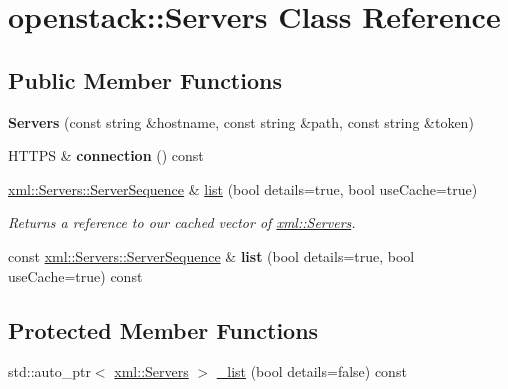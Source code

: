 \hypertarget{classopenstack_1_1Servers}{
\section{openstack::Servers Class Reference}
\label{classopenstack_1_1Servers}
}
\subsection*{Public Member Functions}
\begin{DoxyCompactItemize}
\item 
\hypertarget{classopenstack_1_1Servers_aa73baeb7fe19a9fcbb33b9b1c321c0b3}{
{\bfseries Servers} (const string \&hostname, const string \&path, const string \&token)}
\label{classopenstack_1_1Servers_aa73baeb7fe19a9fcbb33b9b1c321c0b3}

\item 
\hypertarget{classopenstack_1_1Servers_ac46388d4916edea6bbe24c6c1189397a}{
HTTPS \& {\bfseries connection} () const }
\label{classopenstack_1_1Servers_ac46388d4916edea6bbe24c6c1189397a}

\item 
\hyperlink{classopenstack_1_1xml_1_1Servers_a9cc28e68df0ebb654db381f4bc6b43e0}{xml::Servers::ServerSequence} \& \hyperlink{classopenstack_1_1Servers_ac7aa9b652744badc3ea60b685404bf6a}{list} (bool details=true, bool useCache=true)
\begin{DoxyCompactList}\small\item\em Returns a reference to our cached vector of \hyperlink{classopenstack_1_1xml_1_1Servers}{xml::Servers}. \item\end{DoxyCompactList}\item 
\hypertarget{classopenstack_1_1Servers_aeb5dba2917cd66a660a633f8e1d43e66}{
const \hyperlink{classopenstack_1_1xml_1_1Servers_a9cc28e68df0ebb654db381f4bc6b43e0}{xml::Servers::ServerSequence} \& {\bfseries list} (bool details=true, bool useCache=true) const }
\label{classopenstack_1_1Servers_aeb5dba2917cd66a660a633f8e1d43e66}

\end{DoxyCompactItemize}
\subsection*{Protected Member Functions}
\begin{DoxyCompactItemize}
\item 
std::auto\_\-ptr$<$ \hyperlink{classopenstack_1_1xml_1_1Servers}{xml::Servers} $>$ \hyperlink{classopenstack_1_1Servers_a26cf89cc479c447e4e9503bd3d7674ab}{\_\-list} (bool details=false) const 
\end{DoxyCompactItemize}
